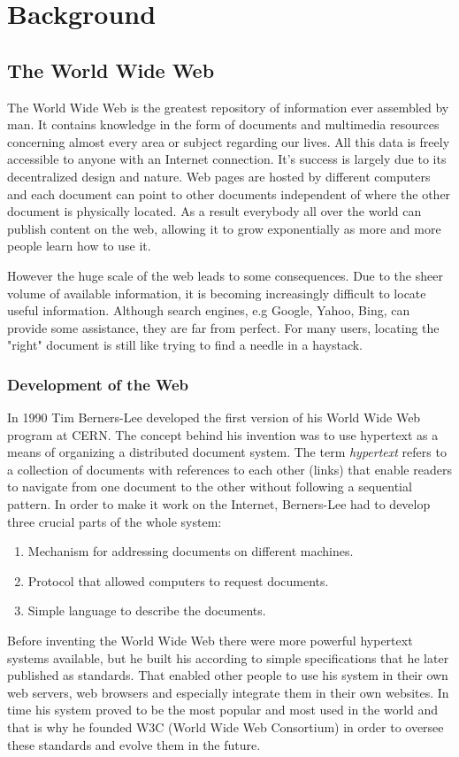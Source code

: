 \chapter{Background}
\section{The World Wide Web}
The World Wide Web is the greatest repository of information ever assembled by
man. It contains knowledge in the form of documents and multimedia resources concerning almost every area or subject regarding our lives. All this data is freely accessible to anyone with an Internet connection. It’s success is largely due to its decentralized design and nature. Web pages are hosted by different computers and each document can point to other documents independent of where the other document is physically located. As a result everybody all over the world can publish content on the web, allowing it to grow exponentially as more and more people learn how to use it.

However the huge scale of the web leads to some consequences. Due to the sheer volume of available information, it is becoming increasingly difficult to locate useful
information. Although search engines, e.g Google, Yahoo, Bing,  can provide some assistance, they are far from perfect. For many users, locating the "right" document is still like trying to find a needle in a haystack.

\subsection{Development of the Web}
In 1990 Tim Berners-Lee developed the first version of his World Wide Web
program at CERN. The concept behind his invention was to use hypertext as a means of organizing a distributed document system. The term \textit{hypertext} refers to a collection of documents with references to each other (links) that enable readers to navigate from one document to the other without following a sequential pattern. In order to make it work on the Internet, Berners-Lee had to develop three crucial parts of the whole system:
\begin{enumerate}
    \item Mechanism for addressing documents on different machines.
    \item Protocol that allowed computers to request documents.
    \item Simple language to describe the documents.
\end{enumerate}
 Before inventing the World Wide Web there were more powerful hypertext systems available, but he built his according to simple specifications that he later published as standards. That enabled other people to use his system in their own web servers, web browsers and especially integrate them in their own websites. In time his system proved to be the most popular and most used in the world and that is why he founded W3C (World Wide Web Consortium) in order to oversee these standards and evolve them in the future.

